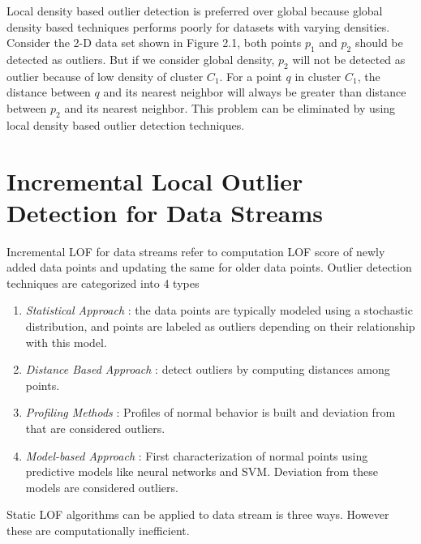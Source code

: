 	
	
	\par 
	Local density based outlier detection is preferred over global because global density based techniques performs poorly for datasets with varying densities.
	Consider the 2-D data set shown in Figure 2.1, both points $p_1$ and $p_2$ should be detected as outliers. But if we consider global density, $p_2$ will not be detected as outlier because of low density of cluster $C_1$. For a point $q$ in cluster $C_1$, the distance between $q$ and its nearest neighbor will always be greater than distance between $p_2$ and its nearest neighbor. This problem can be eliminated by using local density based outlier detection techniques.
	


	
	
	\section{Incremental Local Outlier Detection for Data Streams}
	Incremental LOF for data streams refer to computation LOF score of newly added data points and updating the same for older data points. Outlier detection techniques are categorized into 4 types \cite{f}
	
	\begin{enumerate}
		\item \textit{Statistical Approach} : the data points are typically modeled using a stochastic distribution, and points are labeled as outliers depending on their relationship with this model.
		
		\item \textit{Distance Based Approach} : detect outliers by computing distances among points.
		
		\item \textit{Profiling Methods} : Profiles of normal behavior is built and deviation from that are considered outliers.
		
		\item \textit{Model-based Approach} : First characterization of normal points using predictive models like neural networks and SVM. Deviation from these models are considered outliers.
		
		
	\end{enumerate}
	
	Static LOF algorithms can be applied to data stream is three ways. However these are computationally inefficient.
	
